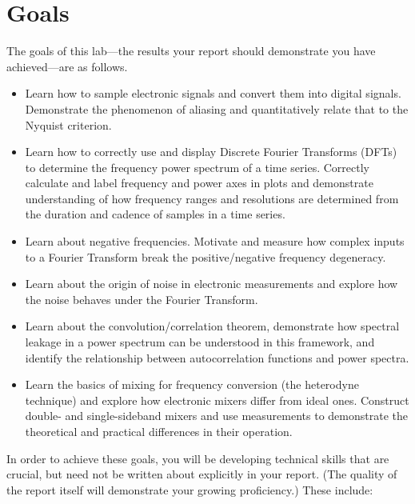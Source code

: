\documentclass[12pt,preprint]{aastex}
\begin{document}
\section{Goals} \label{goals}

\noindent
The goals of this lab---the results your report should
demonstrate you have achieved---are as follows.

\begin{itemize}

\item Learn how to sample electronic signals and convert them into digital signals. Demonstrate
the phenomenon of aliasing and quantitatively relate that to the Nyquist criterion.

\item Learn how to correctly use and display Discrete Fourier Transforms (DFTs) to 
  determine the frequency power spectrum of a time
  series. Correctly calculate and label frequency and power axes in plots and demonstrate
  understanding of how frequency ranges and resolutions are determined from the duration and 
  cadence of samples in a time series.

\item Learn about negative frequencies. Motivate and measure how complex inputs to a Fourier Transform
break the positive/negative frequency degeneracy.


\item Learn about the origin of noise in electronic measurements and explore how the noise behaves 
  under the Fourier Transform.

\item Learn about the convolution/correlation theorem, demonstrate how
  spectral leakage in a power spectrum can be understood in this framework,
  and identify the relationship between 
  autocorrelation functions and power spectra.

\item Learn the basics of mixing for frequency conversion
  (the heterodyne technique) and explore how electronic mixers differ from
  ideal ones. Construct double- and single-sideband mixers and use measurements
  to demonstrate the theoretical and practical differences in their operation.

\end{itemize}

\noindent
In order to achieve these goals, you will be developing technical skills that are
crucial, but need not be written about explicitly in your report. (The quality of
the report itself will demonstrate your growing proficiency.) These include:
\end{document}
